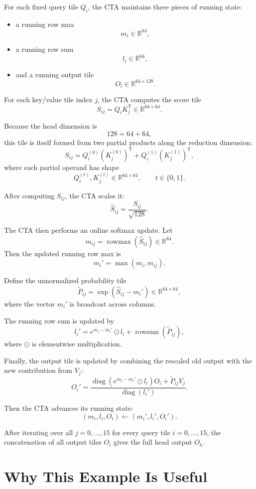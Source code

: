 \documentclass[11pt]{article}
\newcommand{\R}{\mathbb{R}}
\newcommand{\trans}{\mathsf{T}}
\begin{document}
For each fixed query tile $Q_i$, the CTA maintains three pieces of running
state:
\begin{itemize}
    \item a running row max
    \[
    m_i \in \R^{64},
    \]
    \item a running row sum
    \[
    l_i \in \R^{64},
    \]
    \item and a running output tile
    \[
    O_i \in \R^{64 \times 128}.
    \]
\end{itemize}

For each key/value tile index $j$, the CTA computes the score tile
\[
S_{ij} = Q_i K_j^\trans \in \R^{64 \times 64}.
\]

Because the head dimension is
\[
128 = 64 + 64,
\]
this tile is itself formed from two partial products along the reduction
dimension:
\[
S_{ij}
=
Q_i^{(0)} \left(K_j^{(0)}\right)^\trans
+
Q_i^{(1)} \left(K_j^{(1)}\right)^\trans,
\]
where each partial operand has shape
\[
Q_i^{(t)}, K_j^{(t)} \in \R^{64 \times 64},
\qquad
t \in \{0,1\}.
\]

After computing $S_{ij}$, the CTA scales it:
\[
\widehat{S}_{ij} = \frac{S_{ij}}{\sqrt{128}}.
\]

The CTA then performs an online softmax update. Let
\[
m_{ij} = \operatorname{rowmax}(\widehat{S}_{ij}) \in \R^{64}.
\]
Then the updated running row max is
\[
m_i' = \max(m_i, m_{ij}).
\]

Define the unnormalized probability tile
\[
\widetilde{P}_{ij} = \exp\!\left(\widehat{S}_{ij} - m_i'\right)
\in \R^{64 \times 64},
\]
where the vector $m_i'$ is broadcast across columns.

The running row sum is updated by
\[
l_i' = e^{m_i - m_i'} \odot l_i + \operatorname{rowsum}(\widetilde{P}_{ij}),
\]
where $\odot$ is elementwise multiplication.

Finally, the output tile is updated by combining the rescaled old output with
the new contribution from $V_j$:
\[
O_i'
=
\frac{
\operatorname{diag}\!\left(e^{m_i - m_i'} \odot l_i\right) O_i
+
\widetilde{P}_{ij} V_j
}{
\operatorname{diag}(l_i')
}.
\]

Then the CTA advances its running state:
\[
(m_i, l_i, O_i) \leftarrow (m_i', l_i', O_i').
\]

After iterating over all $j = 0, \dots, 15$ for every query tile $i = 0, \dots,
15$, the concatenation of all output tiles $O_i$ gives the full head output
$O_h$.

\section{Why This Example Is Useful}
\end{document}
